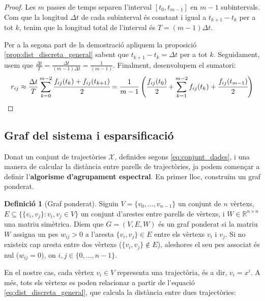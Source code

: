 \documentclass[12,twoside]{TFG-GM}
\theoremstyle{definition}
\newtheorem{definition}[theorem]{Definició}
\theoremstyle{remark}
\newcommand{\R}{\mathbb{R}}
\begin{document}
\begin{proof}
Les $m$ passes de temps separen l'interval $[t_0, t_{m-1}]$ en $m-1$ subintervals. Com que la longitud $\Delta t$ de cada subinterval és constant i igual a $t_{k+1} - t_k$ per a tot $k$, tenim que la longitud total de l'interval és $T=(m-1)\Delta t$.

Per a la segona part de la demostració apliquem la proposició \ref{prop:dist_discreta_general} sabent que $t_{k+1} - t_k = \Delta t$ per a tot $k$. Seguidament, usem que $\frac{\Delta t}{T} = \frac{\Delta t}{(m-1)\Delta t} = \frac{1}{(m-1)}$. Finalment, desenvolupem el sumatori:
$$r_{ij} \approx \frac{\Delta t}{T} \sum_{k=0}^{m-2} \cfrac{f_{ij}(t_k) + f_{ij}(t_{k+1})}{2} 
= \frac{1}{m-1} \left( \cfrac{f_{ij}(t_0)}{2} + \sum_{k=1}^{m-2} f_{ij}(t_k) + \cfrac{f_{ij}(t_{m-1})}{2} \right)$$
\end{proof}


\subsection{Graf del sistema i esparsificació}

Donat un conjunt de trajectòries $\mathcal{X}$, definides segons \eqref{eq:conjunt_dades}, i una manera de calcular la distància entre parells de trajectòries, ja podem començar a definir l'\textbf{algorisme d'agrupament espectral}. En primer lloc, construïm un graf ponderat.

\begin{definition}[Graf ponderat]
    Siguin $V = \{v_0,\dots,v_{n-1}\}$ un conjunt de $n$ vèrtexs, $E \subseteq \{\{v_i, v_j\} : v_i, v_j \in V\}$ un conjunt d'arestes entre parells de vèrtexs, i $W\in\R^{n\times n}$ una matriu simètrica. Diem que $G = (V,E, W)$ és un graf ponderat si la matriu $W$ assigna un pes $w_{ij}>0$ a l'aresta $\{v_i, v_j\} \in E$ entre els vèrtexs $v_i$ i $v_j$. Si no existeix cap aresta entre dos vèrtexs ($\{v_i, v_j\} \notin E$), aleshores el seu pes associat és nul ($w_{ij} = 0$), on $i,j\in\{0,\dots,n-1\}$.
\end{definition}

En el nostre cas, cada vèrtex $v_i\in V$ representa una trajectòria, és a dir, $v_i=x^i$. A més, tots els vèrtexs es poden relacionar a partir de l'equació \eqref{eq:dist_discreta_general}, que calcula la distància entre dues trajectòries:
\end{document}
